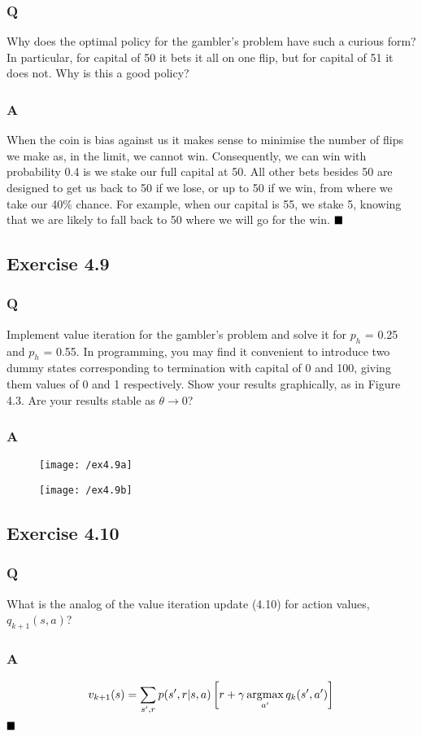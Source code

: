 \subsubsection{Q} Why does the optimal policy for the gambler’s problem have such a curious form? In particular, for capital of 50 it bets it all on one flip, but for capital of 51 it does not. Why is this a good policy?
\subsubsection{A}
When the coin is bias against us it makes sense to minimise the number of flips we make as, in the limit, we cannot win. Consequently, we can win with probability 0.4 is we stake our full capital at 50. All other bets besides 50 are designed to get us back to 50 if we lose, or up to 50 if we win, from where we take our 40\% chance. For example, when our capital is 55, we stake 5, knowing that we are likely to fall back to 50 where we will go for the win.
$
\hfill \blacksquare
$

\subsection{Exercise 4.9}
\subsubsection{Q} Implement value iteration for the gambler’s problem and solve it for $p_h$ = 0.25 and $p_h$ = 0.55. In programming, you may find it convenient to introduce two dummy states corresponding to termination with capital of 0 and 100, giving them values of 0 and 1 respectively. Show your results graphically, as in Figure 4.3. Are your results stable as $\theta \rightarrow 0$?
\subsubsection{A}
\ProgrammingExercise

\begin{figure}[h!]
	\centering
	\texttt{[image: /ex4.9a]}
	\label{fig:4.9a}
\end{figure}

\begin{figure}[h!]
	\centering
	\texttt{[image: /ex4.9b]}
	\label{fig:4.9b}
\end{figure}

\subsection{Exercise 4.10}
\subsubsection{Q} What is the analog of the value iteration update (4.10) for action values, $q_{k+1}(s, a)$?
\subsubsection{A}
\begin{equation}
v_{k+1}(s) =  \sum_{s',r} p(s', r |s, a)\left[r + \gamma \operatorname*{\arg\!\max}_{a'} q_k(s', a')\right]
\end{equation}
$
\hfill \blacksquare
$